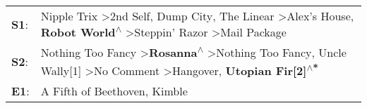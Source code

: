 \begin{supertabular}{p{0.03\textwidth}p{0.92\textwidth}}
 \textbf{S1}:  &  Nipple Trix\textsuperscript{} \textgreater \enspace 2nd Self\textsuperscript{}, \enspace Dump City\textsuperscript{}, \enspace The Linear\textsuperscript{} \textgreater \enspace Alex's House\textsuperscript{}, \enspace \textbf{Robot World\textsuperscript{$\wedge$}} \textgreater \enspace Steppin' Razor\textsuperscript{} \textgreater \enspace Mail Package\textsuperscript{}  \enspace  \\
 \textbf{S2}:  &             Nothing Too Fancy\textsuperscript{} \textgreater \enspace \textbf{Rosanna\textsuperscript{$\wedge$}} \textgreater \enspace Nothing Too Fancy\textsuperscript{}, \enspace Uncle Wally[1]\textsuperscript{} \textgreater \enspace No Comment\textsuperscript{} \textgreater \enspace Hangover\textsuperscript{}, \enspace \textbf{Utopian Fir[2]\textsuperscript{$\wedge$*}}  \enspace  \\
 \textbf{E1}:  &                                                                                                                                                                                                                                                                                                              A Fifth of Beethoven\textsuperscript{}, \enspace Kimble\textsuperscript{}  \enspace  \\
\end{supertabular}
